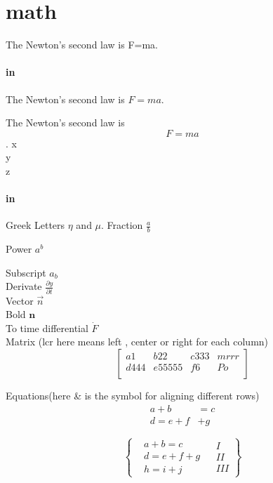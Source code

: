 \documentclass{article}
\begin{document}
	\section{math}The Newton's second law is F=ma. %

	\paragraph{in} The Newton's second law is $F=ma$. %

	The Newton's second law is \[F=ma\].  %
	x\\
	y\\
	z

	\paragraph{in}
	Greek Letters $\eta$ and $\mu$.
	Fraction $\frac{a}{b}$

	Power $a^b$

	Subscript $a_b$\\
	Derivate $\frac{\partial y}{\partial t}$\\
	Vector $\vec{n}$\\
	Bold $\mathbf{n}$\\
	To time differential $\dot{F}$\\
	Matrix (lcr here means left , center or right for each column)
	\[
		\left[
			\begin{array}{llcr}
				a1 & b22 & c333 & mrrr\\
				d444 & e55555 & f6 & Po\\
			\end{array}
		\right]
	\]

	Equations(here \& is the symbol for aligning different rows)
	\begin{align}
		a+b&=c\\
		d=e+f&+g
	\end{align}

	\[
		\left\{ %
			\begin{aligned}
				&a+b=c\\
				&d=e+f+g\\
				&h=i+j
			\end{aligned} %
			\begin{aligned}
				&I \\
				&II\\
				&III
			\end{aligned}
		\right\}%
	\]
	
\end{document}
